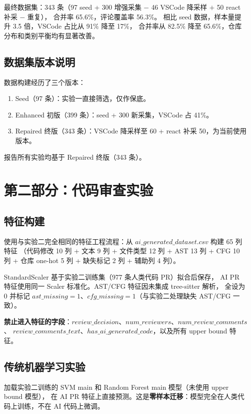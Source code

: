 \documentclass{experimentreport}
\begin{document}
最终数据集：343 条（97 seed + 300 增强采集 $-$ 46 VSCode 降采样 $+$ 50 react 补采 $-$ 重复），
合并率 65.6\%，评论覆盖率 56.3\%。
相比 seed 数据，样本量提升 3.5 倍，VSCode 占比从 91\% 降至 17\%，
合并率从 82.5\% 降至 65.6\%，仓库分布和类别平衡均有显著改善。

\subsection{数据集版本说明}

数据构建经历了三个版本：
\begin{enumerate}
    \item Seed（97 条）：实验一直接筛选，仅作保底。
    \item Enhanced 初版（399 条）：seed + 300 新采集，VSCode 占 41\%。
    \item Repaired 终版（343 条）：VSCode 降采样至 60 + react 补采 50，为当前使用版本。
\end{enumerate}
报告所有实验均基于 Repaired 终版（343 条）。

\section{第二部分：代码审查实验}

\subsection{特征构建}

使用与实验二完全相同的特征工程流程：从 $ai\_generated\_dataset.csv$ 构建 65 列特征
（代码修改 10 列 + 文本 9 列 + 文件类型 12 列 + AST 13 列 + CFG 10 列 + 仓库 one-hot 5 列 +
缺失标记 2 列 + 辅助列 4 列）。

StandardScaler 基于实验二训练集（977 条人类代码 PR）拟合后保存，
AI PR 特征使用同一 Scaler 标准化。AST/CFG 特征因未集成 tree-sitter 解析，
全设为 0 并标记 $ast\_missing=1$、$cfg\_missing=1$（与实验二处理缺失 AST/CFG 一致）。

\textbf{禁止进入特征的字段}：$review\_decision$、$num\_reviewers$、$num\_review\_comments$、
$review\_comments\_text$、$has\_ai\_generated\_code$，以及所有 upper bound 特征。

\subsection{传统机器学习实验}

加载实验二训练的 SVM main 和 Random Forest main 模型（未使用 upper bound 模型），
在 AI PR 特征上直接预测。这是\textbf{零样本迁移}：模型完全在人类代码上训练，不在 AI 代码上微调。
\end{document}
